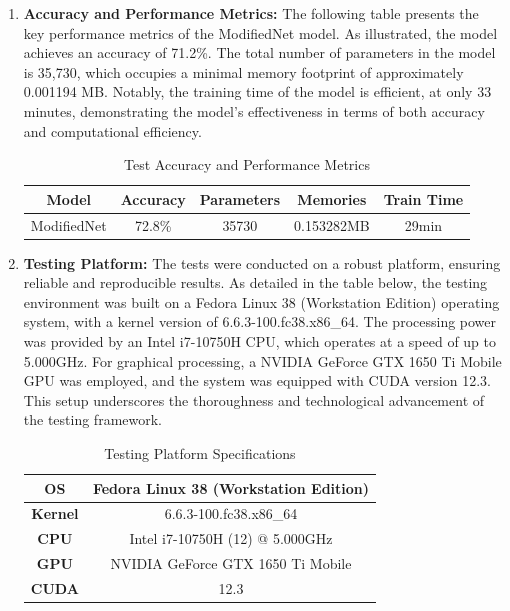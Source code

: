 \documentclass[conference]{IEEEtran}
\begin{document}
	\begin{enumerate}
		\item \textbf{Accuracy and Performance Metrics:}
		The following table presents the key performance metrics of the ModifiedNet model. As illustrated, the model achieves an accuracy of 71.2\%. The total number of parameters in the model is 35,730, which occupies a minimal memory footprint of approximately 0.001194 MB. Notably, the training time of the model is efficient, at only 33 minutes, demonstrating the model's effectiveness in terms of both accuracy and computational efficiency.
		
		\begin{table}[h]
			\centering
			\begin{tabular}{|c|c|c|c|c|}
				\hline
				\textbf{Model} & \textbf{Accuracy} & \textbf{Parameters} & \textbf{Memories} & \textbf{Train Time} \\ \hline
				ModifiedNet    & 72.8\%            & 35730               & 0.153282MB       & 29min               \\ \hline
			\end{tabular}
			\caption{Test Accuracy and Performance Metrics}
			\label{tab:performance_metrics}
		\end{table}
		
		\item \textbf{Testing Platform:}
		The tests were conducted on a robust platform, ensuring reliable and reproducible results. As detailed in the table below, the testing environment was built on a Fedora Linux 38 (Workstation Edition) operating system, with a kernel version of 6.6.3-100.fc38.x86\_64. The processing power was provided by an Intel i7-10750H CPU, which operates at a speed of up to 5.000GHz. For graphical processing, a NVIDIA GeForce GTX 1650 Ti Mobile GPU was employed, and the system was equipped with CUDA version 12.3. This setup underscores the thoroughness and technological advancement of the testing framework.
		
		\begin{table}[h]
			\centering
			\begin{tabular}{|c|c|}
				\hline
				\textbf{OS} & Fedora Linux 38 (Workstation Edition) \\
				\hline
				\textbf{Kernel} & 6.6.3-100.fc38.x86\_64 \\
				\hline
				\textbf{CPU} & Intel i7-10750H (12) @ 5.000GHz \\
				\hline
				\textbf{GPU} & NVIDIA GeForce GTX 1650 Ti Mobile \\
				\hline
				\textbf{CUDA} & 12.3 \\
				\hline
			\end{tabular}
			\caption{Testing Platform Specifications}
			\label{tab:testing_platform}
		\end{table}
	\end{enumerate}
\end{document}

